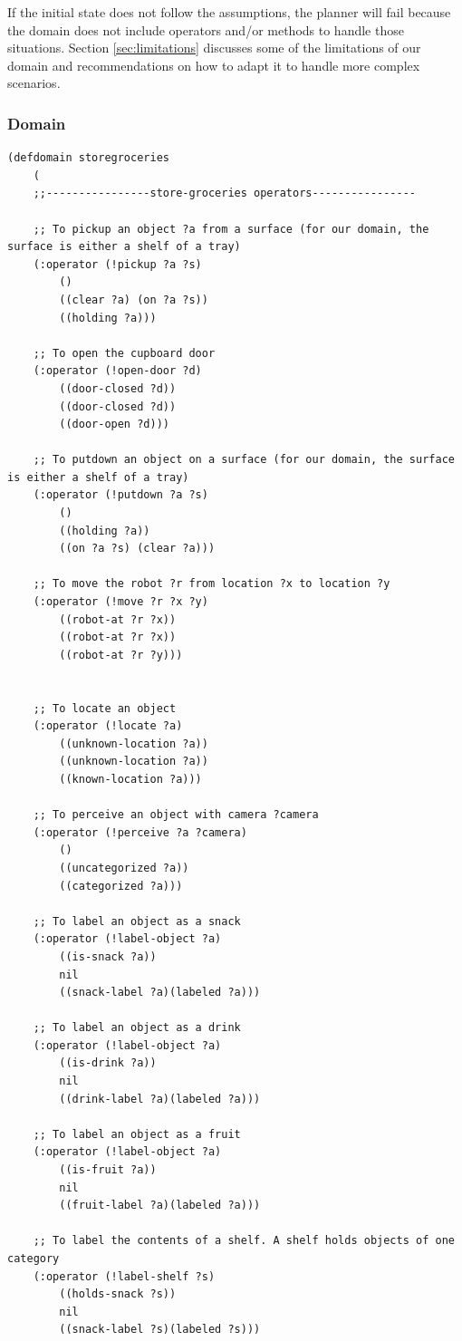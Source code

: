 \documentclass[paper=a4, fontsize=11pt]{scrartcl}
\begin{document}
	If the initial state does not follow the assumptions, the planner will fail because the domain does not include operators and/or methods to handle those situations. Section \ref{sec:limitations} discusses some of the limitations of our domain and recommendations on how to adapt it to handle more complex scenarios.

	\subsubsection*{Domain}

	\begin{lstlisting}
(defdomain storegroceries
	(
	;;----------------store-groceries operators----------------

	;; To pickup an object ?a from a surface (for our domain, the surface is either a shelf of a tray)
	(:operator (!pickup ?a ?s)
		()
		((clear ?a) (on ?a ?s))
		((holding ?a)))

	;; To open the cupboard door
	(:operator (!open-door ?d)
		((door-closed ?d))
		((door-closed ?d))
		((door-open ?d)))

	;; To putdown an object on a surface (for our domain, the surface is either a shelf of a tray)
	(:operator (!putdown ?a ?s)
		()
		((holding ?a))
		((on ?a ?s) (clear ?a)))

	;; To move the robot ?r from location ?x to location ?y
	(:operator (!move ?r ?x ?y)
		((robot-at ?r ?x))
		((robot-at ?r ?x))
		((robot-at ?r ?y)))


	;; To locate an object
	(:operator (!locate ?a)
		((unknown-location ?a))
		((unknown-location ?a))
		((known-location ?a)))

	;; To perceive an object with camera ?camera
	(:operator (!perceive ?a ?camera)
		()
		((uncategorized ?a))
		((categorized ?a)))

	;; To label an object as a snack
	(:operator (!label-object ?a)
		((is-snack ?a))
		nil
		((snack-label ?a)(labeled ?a)))

	;; To label an object as a drink
	(:operator (!label-object ?a)
		((is-drink ?a))
		nil
		((drink-label ?a)(labeled ?a)))

	;; To label an object as a fruit
	(:operator (!label-object ?a)
		((is-fruit ?a))
		nil
		((fruit-label ?a)(labeled ?a)))

	;; To label the contents of a shelf. A shelf holds objects of one category
	(:operator (!label-shelf ?s)
		((holds-snack ?s))
		nil
		((snack-label ?s)(labeled ?s)))


\end{lstlisting}
\end{document}
